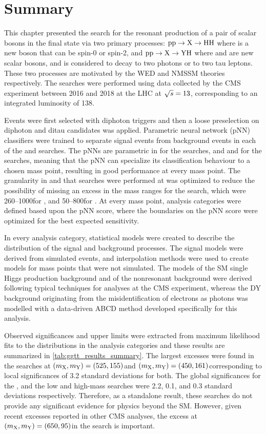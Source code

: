 \section{Summary}\label{sec:ggtt_conclusion}

This chapter presented the search for the resonant production of a pair of scalar bosons in the \ggtt final state via two primary processes: $\mathrm{p}\mathrm{p} \to \mathrm{X} \to \mathrm{H}\mathrm{H}$ where \PX is a new boson that can be spin-0 or spin-2, and $\mathrm{p}\mathrm{p} \to \mathrm{X} \to \mathrm{Y}\mathrm{H}$ where \PX and \PY are new scalar bosons, and \PY is considered to decay to two photons or to two tau leptons. These two processes are motivated by the WED and NMSSM theories respectively. The searches were performed using data collected by the CMS experiment between 2016 and 2018 at the LHC at $\sqrt{s}=13$\TeV, corresponding to an integrated luminosity of 138\fbinv. 

Events were first selected with diphoton triggers and then a loose preselection on diphoton and ditau candidates was applied. Parametric neural network (pNN) classifiers were trained to separate signal events from background events in each of the \XHH and \XYH searches. The pNNs are parametric in \mX for the \XHH searches, and \mX and \mY for the \XYH searches, meaning that the pNN can specialize its classification behaviour to a chosen mass point, resulting in good performance at every mass point. The granularity in \mX and \mY that searches were performed at was optimized to reduce the possibility of missing an excess in the mass ranges for the search, which were 260--1000\GeV for \mX, and 50--800\GeV for \mY. At every mass point, analysis categories were defined based upon the pNN score, where the boundaries on the pNN score were optimized for the best expected sensitivity.

In every analysis category, statistical models were created to describe the \mgg distribution of the signal and background processes. The signal models were derived from simulated events, and interpolation methods were used to create models for mass points that were not simulated. The models of the SM single Higgs production background and of the nonresonant background were derived following typical techniques for \Hgg analyses at the CMS experiment, whereas the DY background originating from the misidentification of electrons as photons was modelled with a data-driven ABCD method developed specifically for this analysis. 

Observed significances and upper limits were extracted from maximum likelihood fits to the \mgg distributions in the analysis categories and these results are summarized in \cref{tab:ggtt_results_summary}. The largest excesses were found in the \XYggHtt searches at $(m_{\mathrm{X}}, m_{\mathrm{Y}}) = (525, 155)$\GeV and $(m_{\mathrm{X}}, m_{\mathrm{Y}}) = (450, 161)$\GeV corresponding to local significances of 3.2 standard deviations for both. The global significances for the \XYttHgg, and the low and high-mass \XYggHtt searches were 2.2, 0.1, and 0.3 standard deviations respectively. Therefore, as a standalone result, these searches do not provide any significant evidence for physics beyond the SM. However, given recent excesses reported in other CMS analyses, the excess at $(m_{\mathrm{X}},m_{\mathrm{Y}}) = (650,95)$\GeV in the \XYggHtt search is important.

